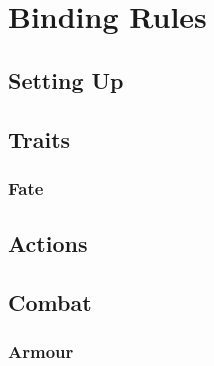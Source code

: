 \documentclass[a4paper,openany]{book}
\date{\today}
\begin{document}
\section*{Binding Rules}

\begin{multicols}{2}

\subsection*{Setting Up}



\subsection*{Traits}





\subsubsection*{Fate}


\subsubsection*{}




\physicalSkillChart

\subsection*{Actions}








\subsection*{Combat}





\commonWeaponsChart

\subsubsection*{Armour}


\end{multicols}
\end{document}

